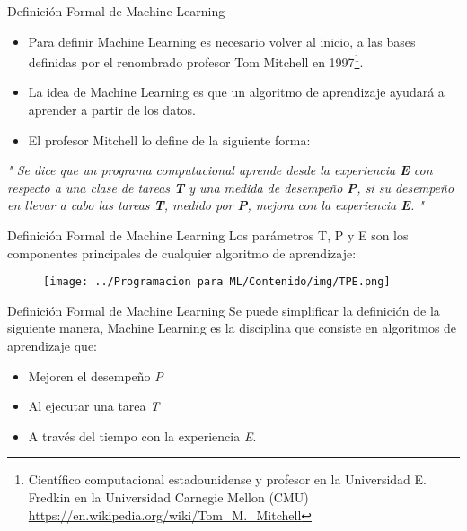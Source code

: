 \documentclass[11pt,aspectratio=169]{beamer}
\begin{document}
\begin{frame}{Definición Formal de Machine Learning}
\begin{itemize}
	\item Para definir Machine Learning es necesario volver al inicio, a las bases definidas por el renombrado profesor Tom Mitchell en 
		1997\footnote{Científico computacional estadounidense y profesor en la Universidad E. Fredkin en la Universidad Carnegie Mellon (CMU) 
		\url{https://en.wikipedia.org/wiki/Tom_M._Mitchell}}.\pause
	\item  La idea de Machine Learning es que un algoritmo de aprendizaje ayudará a aprender a partir de los datos. \pause
	\item El profesor Mitchell lo define de la siguiente forma:\pause
\end{itemize}
\begin{block}{}
\textit{"
Se dice que un programa computacional aprende desde la experiencia \textbf{E} con respecto a una clase de tareas \textbf{T} y una medida de desempeño \textbf{P}, 
si su desempeño en llevar a cabo las tareas \textbf{T}, medido por \textbf{P}, mejora con la experiencia \textbf{E}.
"}
\end{block}
\end{frame}

\begin{frame}{Definición Formal de Machine Learning}
Los parámetros T, P y E son los componentes principales de cualquier algoritmo de aprendizaje:\pause
\begin{figure}[H]
	\centering
	\texttt{[image: ../Programacion para ML/Contenido/img/TPE.png]}
\end{figure}
\end{frame}

\begin{frame}{Definición Formal de Machine Learning}
Se puede simplificar la definición de la siguiente manera, Machine Learning es la disciplina que consiste en algoritmos de aprendizaje que:\pause
\begin{itemize}
	\item Mejoren el desempeño \textit{P}\pause
	\item Al ejecutar una tarea \textit{T}\pause
	\item A través del tiempo con la experiencia \textit{E}.
\end{itemize}
\end{frame}
\end{document}
